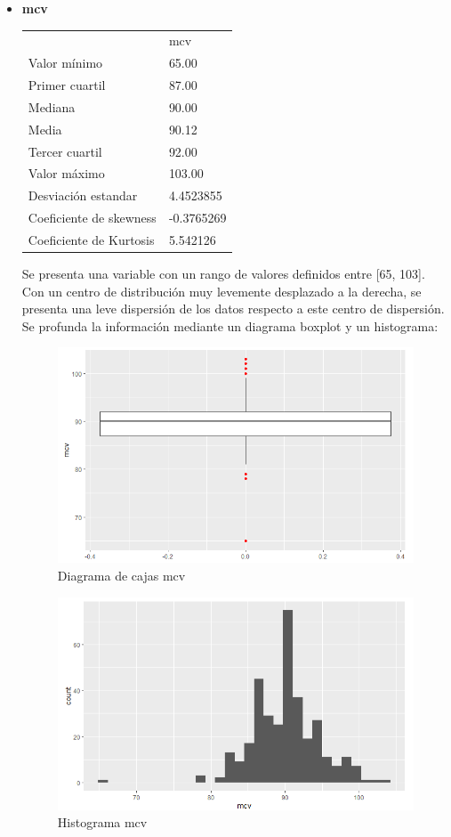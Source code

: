\begin{itemize}
	\item \textbf{mcv}
	\begin{table}[h!]
		\centering
		\begin{tabular}{ll}
			& mcv        \\
			Valor mínimo            & 65.00      \\
			Primer cuartil          & 87.00      \\
			Mediana                 & 90.00      \\
			Media                   & 90.12      \\
			Tercer cuartil          & 92.00      \\
			Valor máximo            & 103.00     \\ \hline
			Desviación estandar     & 4.4523855  \\ \hline
			Coeficiente de skewness & -0.3765269 \\
			Coeficiente de Kurtosis & 5.542126  
		\end{tabular}
	\end{table}
	
Se presenta una variable con un rango de valores definidos entre [65, 103]. Con un centro de distribución muy levemente desplazado a la derecha, se presenta una leve dispersión de los datos respecto a este centro de dispersión.
Se profunda la información mediante un diagrama boxplot y un histograma:
\begin{figure}[h!]
	\centering
	\includegraphics[width=0.7\linewidth]{figures/box_1}
	\caption{Diagrama de cajas mcv}
	\label{fig:box1}
\end{figure}

\begin{figure}[h!]
	\centering
	\includegraphics[width=0.7\linewidth]{figures/hist_1}
	\caption{Histograma mcv}
	\label{fig:hist1}
\end{figure}



\end{itemize}

